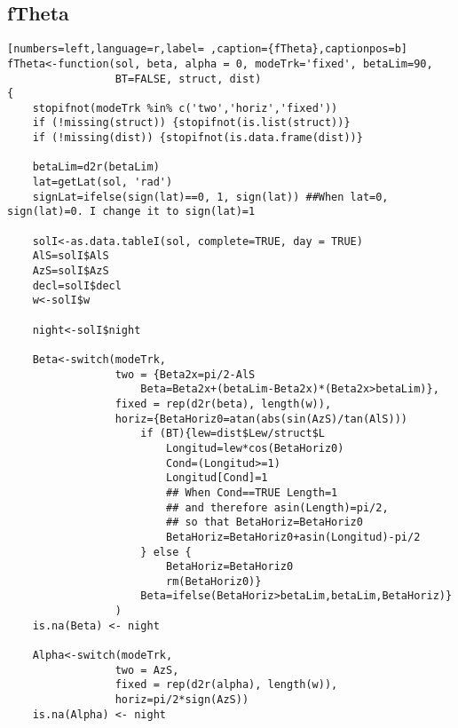 \subsection{fTheta}
\label{sec:orgdbdacba}
\label{subsec:ftheta}
\begin{lstlisting}[numbers=left,language=r,label= ,caption={fTheta},captionpos=b]
fTheta<-function(sol, beta, alpha = 0, modeTrk='fixed', betaLim=90, 
                 BT=FALSE, struct, dist)
{
    stopifnot(modeTrk %in% c('two','horiz','fixed'))
    if (!missing(struct)) {stopifnot(is.list(struct))}
    if (!missing(dist)) {stopifnot(is.data.frame(dist))}

    betaLim=d2r(betaLim)
    lat=getLat(sol, 'rad')
    signLat=ifelse(sign(lat)==0, 1, sign(lat)) ##When lat=0, sign(lat)=0. I change it to sign(lat)=1

    solI<-as.data.tableI(sol, complete=TRUE, day = TRUE)
    AlS=solI$AlS
    AzS=solI$AzS
    decl=solI$decl
    w<-solI$w

    night<-solI$night

    Beta<-switch(modeTrk,
                 two = {Beta2x=pi/2-AlS	
                     Beta=Beta2x+(betaLim-Beta2x)*(Beta2x>betaLim)},
                 fixed = rep(d2r(beta), length(w)), 
                 horiz={BetaHoriz0=atan(abs(sin(AzS)/tan(AlS)))
                     if (BT){lew=dist$Lew/struct$L
                         Longitud=lew*cos(BetaHoriz0)
                         Cond=(Longitud>=1)
                         Longitud[Cond]=1
                         ## When Cond==TRUE Length=1
                         ## and therefore asin(Length)=pi/2,
                         ## so that BetaHoriz=BetaHoriz0
                         BetaHoriz=BetaHoriz0+asin(Longitud)-pi/2                                     
                     } else {
                         BetaHoriz=BetaHoriz0
                         rm(BetaHoriz0)}
                     Beta=ifelse(BetaHoriz>betaLim,betaLim,BetaHoriz)}
                 )
    is.na(Beta) <- night

    Alpha<-switch(modeTrk,
                 two = AzS,
                 fixed = rep(d2r(alpha), length(w)),
                 horiz=pi/2*sign(AzS))
    is.na(Alpha) <- night


\end{lstlisting}
